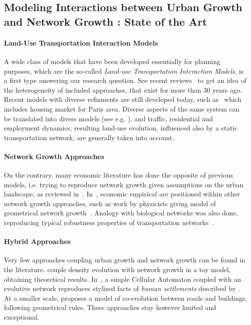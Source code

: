 \subsection{Modeling Interactions between Urban Growth and Network Growth : State of the Art}

\paragraph{Land-Use Transportation Interaction Models}

A wide class of models that have been developed essentially for planning purposes, which are the so-called \emph{Land-use Transportation Interaction Models}, is a first type answering our research question. See recent reviews~\cite{chang2006models,iacono2008models,wegener2004land} to get an idea of the heterogeneity of included approaches, that exist for more than 30 years ago. Recent models with diverse refinments are still developed today, such as~\cite{delons:hal-00319087} which includes housing market for Paris area. Diverse aspects of the same system can be translated into divers models (see e.g. \cite{wegener1991one}), and traffic, residential and employment dynamics, resulting land-use evolution, influenced also by a static transportation network, are generally taken into account.

\paragraph{Network Growth Approaches}
On the contrary, many economic literature has done the opposite of previous models, i.e. trying to reproduce network growth given assumptions on the urban landscape, as reviewed in~\cite{zhang2007economics}. In~\cite{xie2009modeling}, economic empirical are positioned within other network growth approaches, such as work by physicists giving model of geometrical network growth~\cite{barthelemy2008modeling}. Analogy with biological networks was also done, reproducing typical robustness properties of transportation networks~\cite{TeroAl10}.


\paragraph{Hybrid Approaches}

Very few approaches coupling urban growth and network growth can be found in the literature. \cite{barthelemy2009co} couple density evolution with network growth in a toy model, obtaining theoretical results. In~\cite{raimbault2014hybrid}, a simple Cellular Automaton coupled with an evolutive network reproduces stylized facts of \emph{human settlements} described by . At a smaller scale, \cite{achibet2014model} proposes a model of co-evolution between roads and buildings, following geometrical rules. These approaches stay however limited and exceptional.


